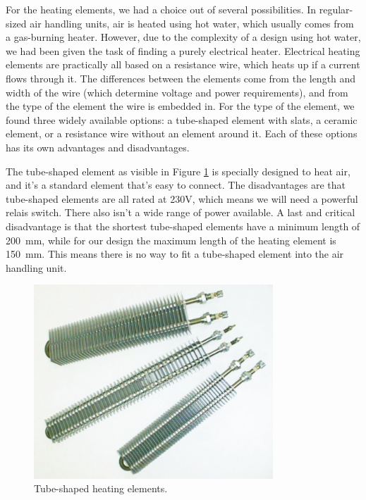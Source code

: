\documentclass[a4paper,oneside]{book}
\begin{document}
For the heating elements, we had a choice out of several possibilities. In
regular-sized air handling units, air is heated using hot water, which usually
comes from a gas-burning heater. However, due to the complexity of a design
using hot water, we had been given the task of finding a purely electrical
heater. Electrical heating elements are practically all based on a resistance
wire, which heats up if a current flows through it. The differences between the
elements come from the length and width of the wire (which determine voltage
and power requirements), and from the type of the element the wire is embedded
in. For the type of the element, we found three widely available options: a
tube-shaped element with slats, a ceramic element, or a resistance wire without
an element around it. Each of these options has its own advantages and
disadvantages.

The tube-shaped element as visible in Figure \ref{fig:tube-heating} is
specially designed to heat air, and it's a standard element that's easy to
connect. The disadvantages are that tube-shaped elements are all rated at 230V,
which means we will need a powerful relais switch. There also isn't a wide
range of power available. A last and critical disadvantage is that the shortest
tube-shaped elements have a minimum length of \SI{200}{\mm}, while for our
design the maximum length of the heating element is \SI{150}{mm}. This means
there is no way to fit a tube-shaped element into the air handling unit.

\begin{figure}[h]
\centering
\includegraphics[width=0.8\textwidth]{images/tube-heater.jpg}
\caption{Tube-shaped heating elements. \protect\cite{tube-heater}}
\label{fig:tube-heating}
\end{figure}
\end{document}
